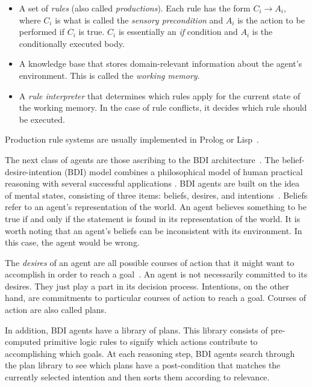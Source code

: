 \begin{itemize}

    \item A set of \textit{rules} (also called \textit{productions}).
        Each rule has the form $ C_i \rightarrow A_i $,
        where $ C_i $ is what is called the \textit{sensory precondition}
        and $ A_i $ is the action to be performed if $ C_i $ is true.
        $ C_i $ is essentially an \textit{if} condition and $ A_i $ is the conditionally executed body.

    \item A knowledge base that stores domain-relevant information about the agent's environment.
        This is called the \textit{working memory}.

    \item A \textit{rule interpreter} that determines which rules apply for the current state of the working memory.
        In the case of rule conflicts, it decides which rule should be executed.

\end{itemize}


Production rule systems are usually implemented in Prolog or Lisp~\cite{balke_how_2014}.

The next class of agents are those ascribing to the BDI architecture~\cite{balke_how_2014}.
The belief-desire-intention (BDI) model combines a philosophical model of human practical reasoning
with several successful applications \cite{georgeff_belief-desire-intention_1999}.
BDI agents are built on the idea of mental states,
consisting of three items: beliefs, desires, and intentions~\cite{balke_how_2014}.
Beliefs refer to an agent's representation of the world.
An agent believes something to be true if and only if the statement is found in its representation of the world.
It is worth noting that an agent's beliefs can be inconsistent with its environment.
In this case, the agent would be wrong.

The \textit{desires} of an agent are all possible courses of action that it might want to accomplish in order to reach a goal~\cite{balke_how_2014}.
An agent is not necessarily committed to its desires.
They just play a part in its decision process.
Intentions, on the other hand, are commitments to particular courses of action to reach a goal.
Courses of action are also called plans.

In addition, BDI agents have a library of plans.
This library consists of pre-computed primitive logic rules to signify which actions contribute to accomplishing which goals.
At each reasoning step, BDI agents search through the plan library to see which plans have a post-condition that matches the currently selected intention
and then sorts them according to relevance.

